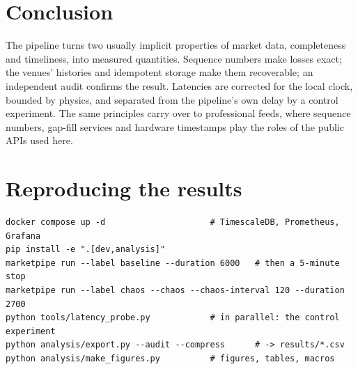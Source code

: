 \documentclass[11pt,a4paper]{article}
\begin{document}
\section{Conclusion}

The pipeline turns two usually implicit properties of market data, completeness and timeliness, into measured
quantities. Sequence numbers make losses exact; the venues' histories and idempotent storage make them
recoverable; an independent audit confirms the result. Latencies are corrected for the local clock, bounded by
physics, and separated from the pipeline's own delay by a control experiment. The same principles carry over to
professional feeds, where sequence numbers, gap-fill services and hardware timestamps play the roles of the
public APIs used here.

\appendix
\section{Reproducing the results}

\begin{verbatim}
docker compose up -d                     # TimescaleDB, Prometheus, Grafana
pip install -e ".[dev,analysis]"
marketpipe run --label baseline --duration 6000   # then a 5-minute stop
marketpipe run --label chaos --chaos --chaos-interval 120 --duration 2700
python tools/latency_probe.py            # in parallel: the control experiment
python analysis/export.py --audit --compress      # -> results/*.csv
python analysis/make_figures.py          # figures, tables, macros
\end{verbatim}



\end{document}
